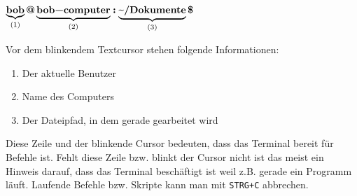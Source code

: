 \( \underbrace{\textbf{\lstinline|bob|}}_{(1)} \textbf{\lstinline|@|} \underbrace{\textbf{\lstinline|bob-computer|}}_{(2)} \textbf{\lstinline|:|} \underbrace{\textbf{\textapprox\lstinline|/Dokumente|}}_{(3)} \textbf{\lstinline|$|} \)

Vor dem blinkendem Textcursor stehen folgende Informationen:
\begin{enumerate}
\item Der aktuelle Benutzer
\item Name des Computers
\item Der Dateipfad, in dem gerade gearbeitet wird
\end{enumerate}

Diese Zeile und der blinkende Cursor bedeuten, dass das Terminal bereit für Befehle ist. Fehlt diese Zeile bzw. blinkt der Cursor nicht ist das meist ein Hinweis darauf, dass das Terminal beschäftigt ist weil z.B. gerade ein Programm läuft. Laufende Befehle bzw. Skripte kann man mit \lstinline|STRG+C| abbrechen.

